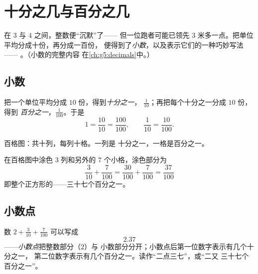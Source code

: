 \chapter{十分之几与百分之几}\label{ch:g4:decimals}

在 $3$ 与 $4$ 之间，整数便“沉默”了——
但一位跑者可能已领先 $3$ 米多一点。把单位平均分成十份，再分成一百份，
便得到了\emph{小数}，以及表示它们的一种巧妙写法——
。（小数的完整内容
在\cref{ch:g5:decimals}中。）

\section{小数}

\begin{definition}[十分之一与百分之一]\label{def:g4:decimals:def}
把一个单位平均分成 $10$ 份，得到\emph{十分之一}，
$\frac{1}{10}$；再把每个十分之一分成 $10$ 份，得到
\emph{百分之一}，$\frac{1}{100}$。于是
\[
1 = \frac{10}{10} = \frac{100}{100},
\qquad
\frac{1}{10} = \frac{10}{100}.
\]
\end{definition}

\begin{omfigure}

{\small 百格图：共十列，每列十格。一列是
十分之一，一格是百分之一。}
\end{omfigure}

\begin{example}\label{ex:g4:decimals:count}
在百格图中涂色 $3$ 列和另外的 $7$ 个小格，涂色部分为
\[
\frac{3}{10} + \frac{7}{100} = \frac{30}{100} + \frac{7}{100}
= \frac{37}{100}
\]
即整个正方形的——三十七个百分之一。
\end{example}

\section{小数点}

\begin{definition}[小数的写法]\label{def:g4:decimals:point}
数 $2 + \frac{3}{10} + \frac{7}{100}$ 可以写成
\[
2.37
\]
——\emph{小数点}把整数部分（$2$）与
小数部分分开；小数点后第一位数字表示有几个十分之一，
第二位数字表示有几个百分之一。读作“二点三七”，或“二又
三十七个百分之一”。
\end{definition}

